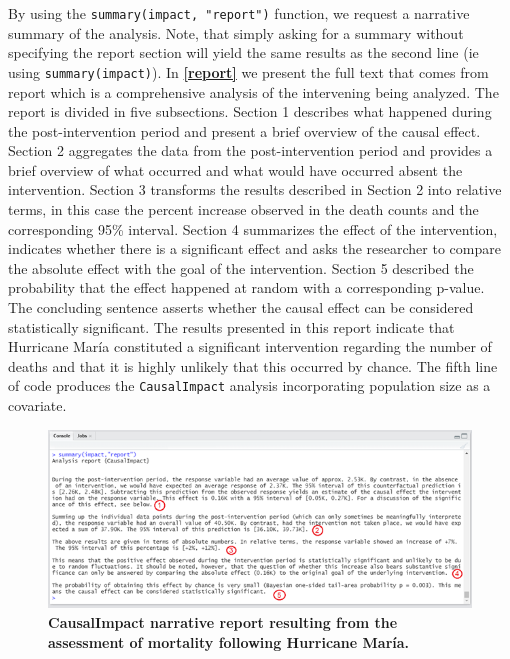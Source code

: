 \documentclass[12pt]{article}
\begin{document}
By using the \texttt{summary(impact,\ "report")} function, we request a
narrative summary of the analysis. Note, that simply asking for a
summary without specifying the report section will yield the same
results as the second line (ie using \texttt{summary(impact)}). In
\textbf{\autoref{report}} we present the full text that comes from
report which is a comprehensive analysis of the intervening being
analyzed. The report is divided in five subsections. Section 1 describes
what happened during the post-intervention period and present a brief
overview of the causal effect. Section 2 aggregates the data from the
post-intervention period and provides a brief overview of what occurred
and what would have occurred absent the intervention. Section 3
transforms the results described in Section 2 into relative terms, in
this case the percent increase observed in the death counts and the
corresponding 95\% interval. Section 4 summarizes the effect of the
intervention, indicates whether there is a significant effect and asks
the researcher to compare the absolute effect with the goal of the
intervention. Section 5 described the probability that the effect
happened at random with a corresponding p-value. The concluding sentence
asserts whether the causal effect can be considered statistically
significant. The results presented in this report indicate that
Hurricane María constituted a significant intervention regarding the
number of deaths and that it is highly unlikely that this occurred by
chance. The fifth line of code produces the \texttt{CausalImpact}
analysis incorporating population size as a covariate.

\begin{figure}
\includegraphics[width=1\linewidth]{../MainDocument/Picture1} \caption{\textbf{CausalImpact narrative report resulting from the assessment of mortality following Hurricane María.}\label{report}}\label{fig:unnamed-chunk-6}
\end{figure}
\end{document}
